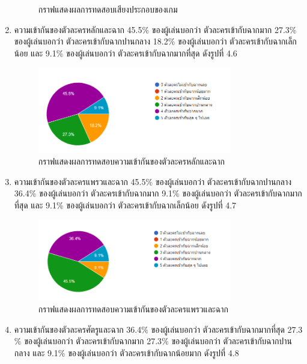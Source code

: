 \begin{enumerate}
\begin{figure}
        \caption[กราฟแสดงผลการทดสอบเสียงประกอบของเกม]{กราฟแสดงผลการทดสอบเสียงประกอบของเกม}
    \end{figure}
    \item ความเข้ากันของตัวละครหลักและฉาก 45.5$\%$ ของผู้เล่นบอกว่า ตัวละครเข้ากับฉากมาก 27.3$\%$ ของผู้เล่นบอกว่า ตัวละครเข้ากับฉากปานกลาง 18.2$\%$ ของผู้เล่นบอกว่า ตัวละครเข้ากับฉากเล็กน้อย และ 9.1$\%$ ของผู้เล่นบอกว่า ตัวละครเข้ากับฉากมากที่สุด ดังรูปที่ 4.6
    \begin{figure}
        \centering
        \includegraphics[width=0.8\textwidth, height=0.20\textheight]{Images/Graph Main Character.png}
        \caption[กราฟแสดงผลการทดสอบความเข้ากันของตัวละครหลักและฉาก]{กราฟแสดงผลการทดสอบความเข้ากันของตัวละครหลักและฉาก}
    \end{figure}
    \item ความเข้ากันของตัวละครแพรวและฉาก 45.5$\%$ ของผู้เล่นบอกว่า ตัวละครเข้ากับฉากปานกลาง 36.4$\%$ ของผู้เล่นบอกว่า ตัวละครเข้ากับฉากมาก 9.1$\%$ ของผู้เล่นบอกว่า ตัวละครเข้ากับฉากมากที่สุด และ 9.1$\%$ ของผู้เล่นบอกว่า ตัวละครเข้ากับฉากเล็กน้อย ดังรูปที่ 4.7
    \begin{figure}
        \centering
        \includegraphics[width=0.8\textwidth, height=0.20\textheight]{Images/Graph Preaw Character.png}
        \caption[กราฟแสดงผลการทดสอบความเข้ากันของตัวละครแพรวและฉาก]{กราฟแสดงผลการทดสอบความเข้ากันของตัวละครแพรวและฉาก}
    \end{figure}
    \item ความเข้ากันของตัวละครศัตรูและฉาก 36.4$\%$ ของผู้เล่นบอกว่า ตัวละครเข้ากับฉากมากที่สุด 27.3$\%$ ของผู้เล่นบอกว่า ตัวละครเข้ากับฉากมาก 27.3$\%$ ของผู้เล่นบอกว่า ตัวละครเข้ากับฉากปานกลาง และ 9.1$\%$ ของผู้เล่นบอกว่า ตัวละครเข้ากับฉากน้อยมาก ดังรูปที่ 4.8

\end{enumerate}
